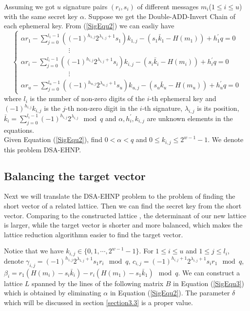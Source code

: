 \documentclass[sigconf]{acmart}
\begin{document}
Assuming we got $u$ signature pairs $(r_i,s_i)$ of different messages $m_i$($1\leq i\leq u$) with the same secret key $\alpha$.
Suppose we get the Double-ADD-Invert Chain of each ephemeral key. From  (\ref{SigEqu2}) we can easliy have
 \begin{equation}
\begin{cases}
\label{SigEqu2}
\alpha r_1-\sum\limits_{j=0}^{l_1-1}((-1)^{h_{1,j}}2^{\lambda_{1,j}+1}s_1)k_{1,j}-(s_1\bar{k}_1-H(m_1))+h^{'}_1q=0  \\
\qquad\qquad\qquad\quad\vdots\\
\alpha r_i-\sum\limits_{j=0}^{l_i-1}((-1)^{h_{i,j}}2^{\lambda_{i,j}+1}s_i)k_{i,j}-(s_i\bar{k}_i-H(m_i))+h^{'}_iq=0  \\
\qquad\qquad\qquad\quad\vdots\\
\alpha r_u-\sum\limits_{j=0}^{l_u-1}((-1)^{h_{u,j}}2^{\lambda_{u,j}+1}s_u)k_{u,j}-(s_u\bar{k}_u-H(m_u))+h^{'}_uq=0
\end{cases}
\end{equation}
where $l_i$ is the number of non-zero digits of the $i$-th ephemeral key and $(-1)^{h_{i,j}}k_{i,j}$ is the $j$-th non-zero digit in the $i$-th signature, $\lambda_{i,j}$ is its position, $\bar{k}_i=\sum\limits_{j=0}^{l_i-1}(-1)^{h_{i,j}}2^{\lambda_{i,j}} \mod q$ and $\alpha, h^{'}_i, k_{i,j}$ are unknown elements in the equations.  \\


Given Equation (\ref{SigEqu2}), find $0<\alpha<q$ and $0\leq k_{i,j}\leq 2^{w-1}-1$. We denote this problem DSA-EHNP.

  \subsection {Balancing the target vector}

     Next we will translate the DSA-EHNP problem to the problem of finding the short vector of a related lattice. Then we can find the secret key from the short vector. Comparing to the constructed lattice \cite{FWC16},  the determinant of our new lattice is larger, while the target vector is shorter and more balanced, which makes the lattice reduction algorithmn easier to find the target vector.

     Notice that we have $k_{i,j}\in \{0,1,\cdots, 2^{w-1}-1\}$. For $1\leq i \leq u$ and $1\leq j\leq l_i$, denote $\gamma_{i,j}=(-1)^{h_{1,j}}2^{\lambda_{1,j}+1}s_1r_i\mod q$, $c_{i,j}=(-1)^{h_{i,j}+1}2^{\lambda_{i,j}+1}s_ir_1\mod q$, $\beta_i=r_1(H(m_i)-s_i\bar{k}_i)-r_i(H(m_1)-s_1\bar{k}_1) \mod q$. We can construct a lattice $L$ spanned by the lines of the following matrix $B$ in Equation (\ref{SigEqu3}) which is obtained by eliminating $\alpha$ in Equation (\ref{SigEqu2}). The parameter $\delta$ which will be discussed in section \ref{section3.3} is  a proper value.
\end{document}
